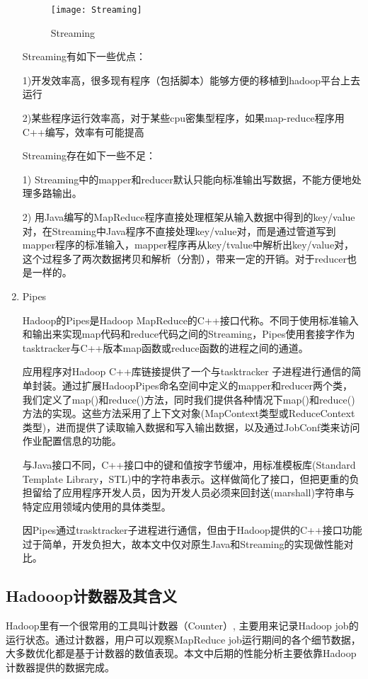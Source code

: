 \begin{enumerate}
\begin{figure}[h]
 \centering
 \texttt{[image: Streaming]}
 \caption{Streaming}
 \label{fig:Streaming}
\end{figure}


Streaming有如下一些优点： 

1)开发效率高，很多现有程序（包括脚本）能够方便的移植到hadoop平台上去运行 

2)某些程序运行效率高，对于某些cpu密集型程序，如果map-reduce程序用C++编写，效率有可能提高 

Streaming存在如下一些不足：

1) Streaming中的mapper和reducer默认只能向标准输出写数据，不能方便地处理多路输出。 

2) 用Java编写的MapReduce程序直接处理框架从输入数据中得到的key/value对，在Streaming中Java程序不直接处理key/value对，而是通过管道写到mapper程序的标准输入，mapper程序再从key/tvalue中解析出key/value对，这个过程多了两次数据拷贝和解析（分割），带来一定的开销。对于reducer也是一样的。

\item Pipes

Hadoop的Pipes是Hadoop MapReduce的C++接口代称。不同于使用标准输入和输出来实现map代码和reduce代码之间的Streaming，Pipes使用套接字作为tasktracker与C++版本map函数或reduce函数的进程之间的通道。

应用程序对Hadoop C++库链接提供了一个与tasktracker 子进程进行通信的简单封装。通过扩展HadoopPipes命名空间中定义的mapper和reducer两个类，我们定义了map()和reduce()方法，同时我们提供各种情况下map()和reduce()方法的实现。这些方法采用了上下文对象(MapContext类型或ReduceContext类型)，进而提供了读取输入数据和写入输出数据，以及通过JobConf类来访问作业配置信息的功能。

与Java接口不同，C++接口中的键和值按字节缓冲，用标准模板库(Standard Template Library，STL)中的字符串表示。这样做简化了接口，但把更重的负担留给了应用程序开发人员，因为开发人员必须来回封送(marshall)字符串与特定应用领域内使用的具体类型。

因Pipes通过trasktracker子进程进行通信，但由于Hadoop提供的C++接口功能过于简单，开发负担大，故本文中仅对原生Java和Streaming的实现做性能对比。

\end{enumerate}
\subsection{Hadooop计数器及其含义}
Hadoop里有一个很常用的工具叫计数器（Counter）, 主要用来记录Hadoop job的运行状态。通过计数器，用户可以观察MapReduce job运行期间的各个细节数据，大多数优化都是基于计数器的数值表现。本文中后期的性能分析主要依靠Hadoop计数器提供的数据完成。

